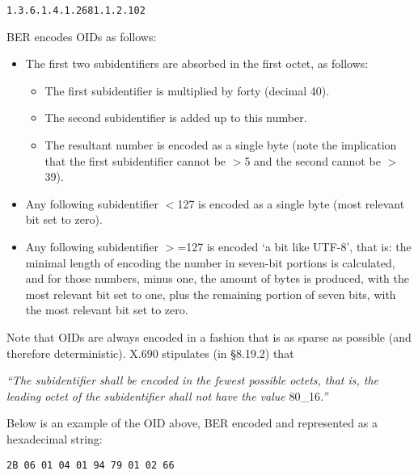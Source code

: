 \begin{changemargin}{-60mm}{0mm}
\begin{myquote}
\begin{verbatim}
1.3.6.1.4.1.2681.1.2.102
\end{verbatim}
\end{myquote}
\end{changemargin}

BER encodes OIDs as follows:
\begin{itemize}
    \item The first two subidentifiers are absorbed in the first octet, as 
follows:
    \begin{itemize}
        \item The first subidentifier is multiplied by forty (decimal 40).
        \item The second subidentifier is added up to this number.
        \item The resultant number is encoded as a single byte (note the 
implication that the first subidentifier cannot be $>$5 and the second 
cannot be $>$39).
    \end{itemize}
    \item Any following subidentifier $<$127 is encoded as a single byte (most 
relevant bit set to zero).
    \item Any following subidentifier $>$=127 is encoded ‘a bit like 
UTF-8’, that is: the minimal length of encoding the number in seven-bit 
portions is calculated, and for those numbers, minus one, the amount of 
bytes is produced, with the most relevant bit set to one, plus the 
remaining portion of seven bits, with the most relevant bit set to zero.
\end{itemize}

Note that OIDs are always encoded in a fashion that is as sparse as 
possible (and therefore deterministic). X.690 \cite{bib:x690} stipulates (in 
§8.19.2) that

\textit{“The subidentifier shall be encoded in the fewest 
possible octets, that is, the leading octet of the subidentifier shall not 
have the value }80_{16}\textit{.”}

Below is an example of the OID above, BER encoded and represented as
a hexadecimal string:

\begin{changemargin}{-60mm}{0mm}
\begin{myquote}
\begin{verbatim}
2B 06 01 04 01 94 79 01 02 66
\end{verbatim}
\end{myquote}
\end{changemargin}

